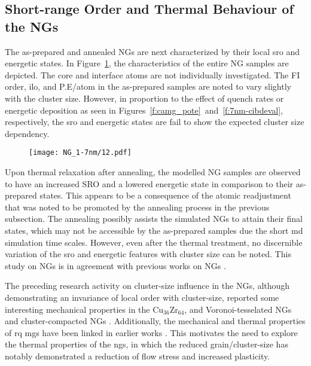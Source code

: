 \subsection{Short-range Order and Thermal Behaviour of the NGs}
The as-prepared and annealed NGs are next characterized by their local \gls{sro} and energetic states. In Figure~\ref{f:NG_str-PE}, the characteristics of the entire NG samples are depicted. The core and interface atoms are not individually investigated. The FI order, \gls{ilo}, and P.E/atom in the as-prepared samples are noted to vary slightly with the cluster size. However, in proportion to the effect of quench rates or energetic deposition as seen in Figures~\ref{f:camg_pote}~and~\ref{f:7nm-cibdeval}, respectively, the \gls{sro} and energetic states are fail to show the expected cluster size dependency. \par

\begin{figure}[!h] \centering
	\texttt{[image: NG\_1-7nm/12.pdf]}
	\label{f:NG_str-PE}
\end{figure}

Upon thermal relaxation after annealing, the modelled NG samples are observed to have an increased SRO and a lowered energetic state in comparison to their as-prepared states. This appears to be a consequence of the atomic readjustment that was noted to be promoted by the annealing process in the previous subsection. The annealing possibly assists the simulated NGs to attain their final states, which may not be accessible by the as-prepared samples due the short \gls{md} simulation time scales. However, even after the thermal treatment, no discernible variation of the \gls{sro} and energetic features with cluster size can be noted. This study on \cz NGs is in agreement with previous works on \czsix NGs \cite{Cheng2019a}. \par

The preceding research activity on cluster-size influence in the NGs, although demonstrating an invariance of local order with cluster-size, reported some interesting mechanical properties in the Cu$_{36}$Zr$_{64}$, \cz and \czsix Voronoi-tesselated NGs \cite{Adibi2013,Adibi2014} and cluster-compacted NGs \cite{Cheng2019a}. Additionally, the mechanical and thermal properties of \gls{rq} \gls{mg}s have been linked in earlier works \cite{Su2016,Battezzati2009,Bian2021}. This motivates the need to explore the thermal properties of the \gls{ng}s, in which the reduced grain/cluster-size has notably demonstrated a reduction of flow stress and increased plasticity. \par

